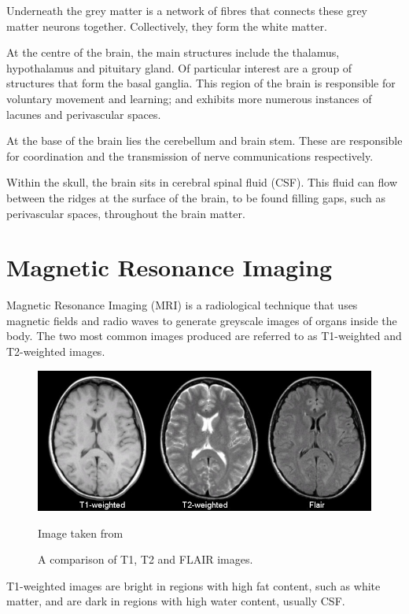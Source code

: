 \documentclass[honours,12pt]{unswthesis}
\numberwithin{equation}{section}
\begin{document}
Underneath the grey matter is a network of fibres that connects these grey matter neurons together. Collectively, they form the white matter. 

At the centre of the brain, the main structures include the thalamus, hypothalamus and pituitary gland. Of particular interest are a group of structures that form the basal ganglia. This region of the brain is responsible for voluntary movement and learning; and exhibits more numerous instances of lacunes and perivascular spaces.

At the base of the brain lies the cerebellum and brain stem. These are responsible for coordination and the transmission of nerve communications respectively.

Within the skull, the brain sits in cerebral spinal fluid (CSF). This fluid can flow between the ridges  at the surface of the brain, to be found filling gaps, such as perivascular spaces, throughout the brain matter.


\section{Magnetic Resonance Imaging}\label{svd-MRI}

Magnetic Resonance Imaging (MRI) is a radiological technique that uses magnetic fields and radio waves to generate greyscale images of organs inside the body. The two most common images produced are referred to as T1-weighted and T2-weighted images.

\begin{figure}[ht]
	\centering
	\includegraphics[width=\textwidth]{Images/2_t1_t2_flair.jpg}
	\caption{A comparison of T1, T2 and FLAIR images.}
	\small Image taken from \cite{Preston2006}
\end{figure}

T1-weighted images are bright in regions with high fat content, such as white matter, and are dark in regions with high water content, usually CSF.
\end{document}
